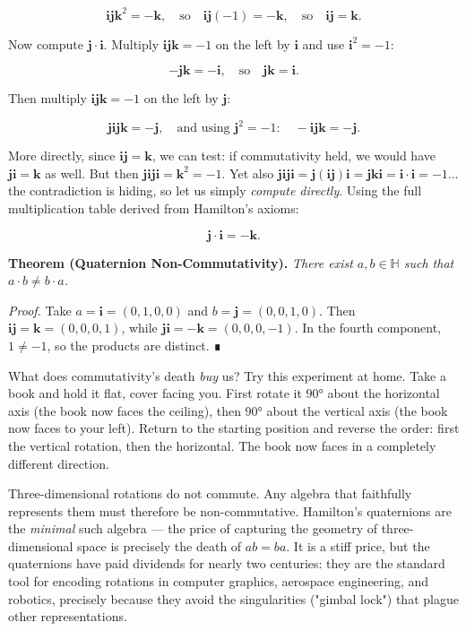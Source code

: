 \[\mathbf{i}\mathbf{j}\mathbf{k}^2 = -\mathbf{k}, \quad \text{so} \quad \mathbf{i}\mathbf{j}(-1) = -\mathbf{k}, \quad \text{so} \quad \mathbf{i}\mathbf{j} = \mathbf{k}.\]

Now compute $\mathbf{j} \cdot \mathbf{i}$. Multiply $\mathbf{i}\mathbf{j}\mathbf{k} = -1$ on the left by $\mathbf{i}$ and use $\mathbf{i}^2 = -1$:

\[-\mathbf{j}\mathbf{k} = -\mathbf{i}, \quad \text{so} \quad \mathbf{j}\mathbf{k} = \mathbf{i}.\]

Then multiply $\mathbf{i}\mathbf{j}\mathbf{k} = -1$ on the left by $\mathbf{j}$:

\[\mathbf{j}\mathbf{i}\mathbf{j}\mathbf{k} = -\mathbf{j}, \quad \text{and using } \mathbf{j}^2 = -1: \quad -\mathbf{i}\mathbf{j}\mathbf{k} = -\mathbf{j}.\]

More directly, since $\mathbf{i}\mathbf{j} = \mathbf{k}$, we can test: if commutativity held, we would have $\mathbf{j}\mathbf{i} = \mathbf{k}$ as well. But then $\mathbf{j}\mathbf{i}\mathbf{j}\mathbf{i} = \mathbf{k}^2 = -1$. Yet also $\mathbf{j}\mathbf{i}\mathbf{j}\mathbf{i} = \mathbf{j}(\mathbf{i}\mathbf{j})\mathbf{i} = \mathbf{j}\mathbf{k}\mathbf{i} = \mathbf{i} \cdot \mathbf{i} = -1$... the contradiction is hiding, so let us simply \textit{compute directly}. Using the full multiplication table derived from Hamilton's axioms:

\[\mathbf{j} \cdot \mathbf{i} = -\mathbf{k}.\]

\textbf{Theorem (Quaternion Non-Commutativity).} \textit{There exist $a, b \in \mathbb{H}$ such that $a \cdot b \neq b \cdot a$.}

\textit{Proof.} Take $a = \mathbf{i} = (0, 1, 0, 0)$ and $b = \mathbf{j} = (0, 0, 1, 0)$. Then $\mathbf{i}\mathbf{j} = \mathbf{k} = (0, 0, 0, 1)$, while $\mathbf{j}\mathbf{i} = -\mathbf{k} = (0, 0, 0, -1)$. In the fourth component, $1 \neq -1$, so the products are distinct. ∎


What does commutativity's death \textit{buy} us? Try this experiment at home. Take a book and hold it flat, cover facing you. First rotate it $90°$ about the horizontal axis (the book now faces the ceiling), then $90°$ about the vertical axis (the book now faces to your left). Return to the starting position and reverse the order: first the vertical rotation, then the horizontal. The book now faces in a completely different direction.


Three-dimensional rotations do not commute. Any algebra that faithfully represents them must therefore be non-commutative. Hamilton's quaternions are the \textit{minimal} such algebra --- the price of capturing the geometry of three-dimensional space is precisely the death of $ab = ba$. It is a stiff price, but the quaternions have paid dividends for nearly two centuries: they are the standard tool for encoding rotations in computer graphics, aerospace engineering, and robotics, precisely because they avoid the singularities ("gimbal lock") that plague other representations.


